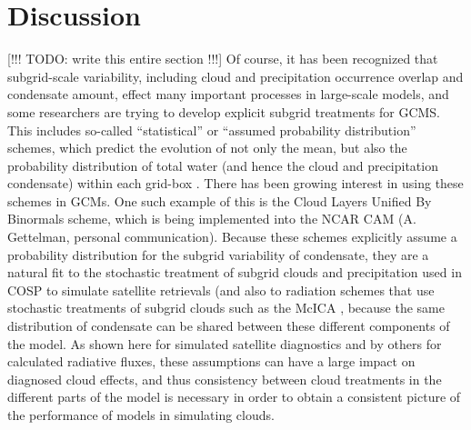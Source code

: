 \section{Discussion}
\label{subgrid2_discussion_section}
[!!! TODO: write this entire section !!!]
Of course, it has been recognized that subgrid-scale variability, including cloud and precipitation occurrence overlap and condensate amount, effect many important processes in large-scale models, and some researchers are trying to develop explicit subgrid treatments for GCMS. This includes so-called ``statistical'' or ``assumed probability distribution'' schemes, which predict the evolution of not only the mean, but also the probability distribution of total water (and hence the cloud and precipitation condensate) within each grid-box \citep[e.g.,][]{tompkins_2002}. There has been growing interest in using these schemes in GCMs. One such example of this is the Cloud Layers Unified By Binormals \citep[CLUBB;][]{golaz_et_al_2002} scheme, which is being implemented into the NCAR CAM (A. Gettelman, personal communication). Because these schemes explicitly assume a probability distribution for the subgrid variability of condensate, they are a natural fit to the stochastic treatment of subgrid clouds and precipitation used in COSP to simulate satellite retrievals (and also to radiation schemes that use stochastic treatments of subgrid clouds such as the McICA \citep{pincus_et_al_2003}, because the same distribution of condensate can be shared between these different components of the model. As shown here for simulated satellite diagnostics and by others for calculated radiative fluxes, these assumptions can have a large impact on diagnosed cloud effects, and thus consistency between cloud treatments in the different parts of the model is necessary in order to obtain a consistent picture of the performance of models in simulating clouds.

